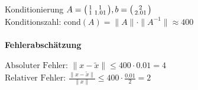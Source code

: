\begin{example2}{Konditionierung}
$A = \begin{psmallmatrix}
1 & 1\\
1 & 1.01
\end{psmallmatrix}, b = \begin{psmallmatrix}
2\\
2.01
\end{psmallmatrix}$\\
Konditionszahl:
$\text{cond}(A) = \|A\| \cdot \|A^{-1}\| \approx 400$
\paragraph{Fehlerabschätzung}
$\text{Absoluter Fehler: }\|x - \tilde{x}\| \leq 400 \cdot 0.01 = 4$ \\
$\text{Relativer Fehler: }\frac{\|x - \tilde{x}\|}{\|x\|} \leq 400 \cdot \frac{0.01}{2} = 2$
\end{example2}

